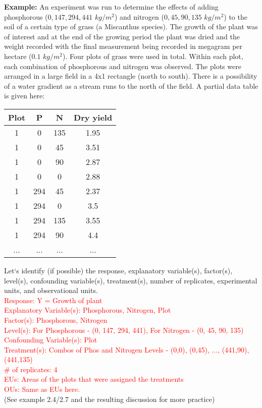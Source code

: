 \documentclass{report}
\begin{document}
\textbf{Example: } An experiment was run to determine the effects of adding phosphorous ($0, 147, 294, 441$ $kg/m^2$) and nitrogen ($0, 45, 90, 135$ $kg/m^2$) to the soil of a certain type of grass (a Miscanthus species).  The growth of the plant was of interest and at the end of the growing period the plant was dried and the weight recorded with the final measurement being recorded in megagram per hectare ($0.1$ $kg/m^2$).  Four plots of grass were used in total.  Within each plot, each combination of phosphorous and nitrogen was observed.  The plots were arranged in a large field in a 4x1 rectangle (north to south).  There is a possibility of a water gradient as a stream runs to the north of the field.   A partial data table is given here: 
\begin{center}
\begin{tabular}{c|c|c|c}
\hline
Plot	&P	&N&	Dry yield\\
\hline
1&	0&	135&	1.95\\
1&	0&	45&	3.51\\
1&	0&	90&	2.87\\
1&	0&	0&	2.88\\
1&	294	&45&	2.37\\
1&	294	&0&	3.5\\
1&	294	&135&	3.55\\
1&	294&	90&	4.4\\
...&...&...&...\\
\end{tabular}
\end{center}
Let`s identify (if possible) the response, explanatory variable(s), factor(s), level(s), confounding variable(s), treatment(s), number of replicates, experimental units, and observational units.  %
\textcolor{red}{\\
Response: Y = Growth of plant\\
Explanatory Variable(s): Phosphorous, Nitrogen, Plot\\
Factor(s): Phosphorous, Nitrogen\\
Level(s): For Phosphorous - (0, 147, 294, 441), For Nitrogen - (0, 45, 90, 135)\\
Confounding Variable(s): Plot\\
Treatment(s): Combos of Phos and Nitrogen Levels - (0,0), (0,45), ..., (441,90),(441,135)\\
\# of replicates: 4\\
EUs: Areas of the plots that were assigned the treatments\\
OUs: Same as EUs here.\\}
(See example 2.4/2.7 and the resulting discussion for more practice)
\end{document}

